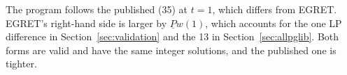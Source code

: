 \documentclass[11pt]{article}
\newcommand{\Pmin}{\underline{P}}
\begin{document}
The program follows the published (35) at $t=1$, which differs from EGRET. EGRET's right-hand side is larger by $\Pmin w(1)$, which accounts for the one LP difference in Section~\ref{sec:validation} and the 13 in Section~\ref{sec:allpglib}. Both forms are valid and have the same integer solutions, and the published one is tighter.



\end{document}
